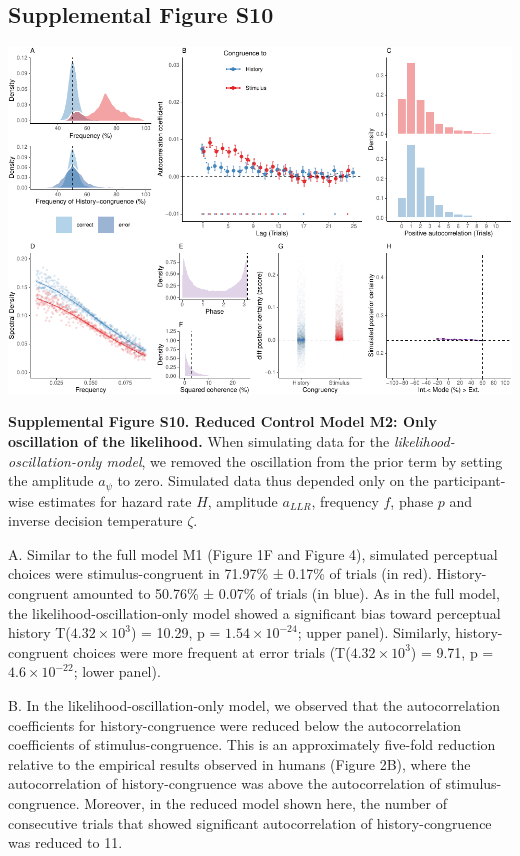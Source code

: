 \documentclass[
]{article}
\begin{document}
\newpage

\hypertarget{supplemental-figure-s10}{%
\subsection{Supplemental Figure S10}\label{supplemental-figure-s10}}

\includegraphics{modes_mouse_rev1b_files/figure-latex/Supplemental_Figure_S10-1.pdf}

\textbf{Supplemental Figure S10. Reduced Control Model M2: Only
oscillation of the likelihood.} When simulating data for the
\emph{likelihood-oscillation-only model}, we removed the oscillation
from the prior term by setting the amplitude \(a_{\psi}\) to zero.
Simulated data thus depended only on the participant-wise estimates for
hazard rate \(H\), amplitude \(a_{LLR}\), frequency \(f\), phase \(p\)
and inverse decision temperature \(\zeta\).

A. Similar to the full model M1 (Figure 1F and Figure 4), simulated
perceptual choices were stimulus-congruent in 71.97\% ± 0.17\% of trials
(in red). History-congruent amounted to 50.76\% ± 0.07\% of trials (in
blue). As in the full model, the likelihood-oscillation-only model
showed a significant bias toward perceptual history
T(\ensuremath{4.32\times 10^{3}}) = 10.29, p =
\(\ensuremath{1.54\times 10^{-24}}\); upper panel). Similarly,
history-congruent choices were more frequent at error trials
(T(\ensuremath{4.32\times 10^{3}}) = 9.71, p =
\(\ensuremath{4.6\times 10^{-22}}\); lower panel).

B. In the likelihood-oscillation-only model, we observed that the
autocorrelation coefficients for history-congruence were reduced below
the autocorrelation coefficients of stimulus-congruence. This is an
approximately five-fold reduction relative to the empirical results
observed in humans (Figure 2B), where the autocorrelation of
history-congruence was above the autocorrelation of stimulus-congruence.
Moreover, in the reduced model shown here, the number of consecutive
trials that showed significant autocorrelation of history-congruence was
reduced to 11.
\end{document}
